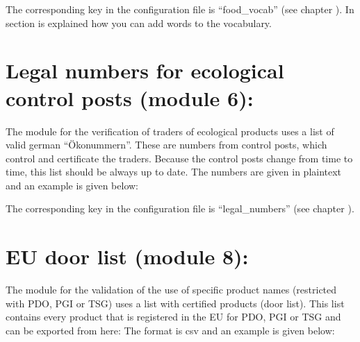 \documentclass[letterpaper,10pt,english]{sphinxmanual}
\begin{document}
The corresponding key in the configuration file is “food\_vocab” (see
chapter {\hyperref[\detokenize{configuration:configuration}]{}}). In section {\hyperref[\detokenize{online_learning:food-vocab-label}]{}} is
explained how you can add words to the vocabulary.


\section{Legal numbers for ecological control posts (module 6):}
\label{\detokenize{external_data:legal-numbers-for-ecological-control-posts-module-6}}\label{\detokenize{external_data:external-legal-numbers}}
The module for the verification of traders of ecological products uses
a list of valid german “Ökonummern”. These are numbers from control
posts, which control and certificate the traders. Because the control
posts change from time to time, this list should be always up to
date. The numbers are given in plaintext and an example is given
below:

%
\begin{sphinxVerbatim}[commandchars=\\\{\}]
\end{sphinxVerbatim}

The corresponding key in the configuration file is “legal\_numbers”
(see chapter {\hyperref[\detokenize{configuration:configuration}]{}}).


\section{EU door list (module 8):}
\label{\detokenize{external_data:external-door}}\label{\detokenize{external_data:eu-door-list-module-8}}
The module for the validation of the use of specific product names
(restricted with PDO, PGI or TSG) uses a list with certified products
(door list). This list contains every product that is registered in
the EU for PDO, PGI or TSG and can be exported from here:
 The format is
csv and an example is given below:
\end{document}

